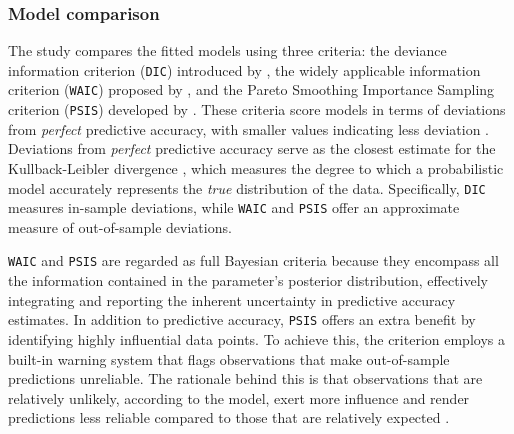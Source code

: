 \documentclass[
  authoryear,
  preprint,
  1p]{elsarticle}
\begin{document}
\subsubsection{Model comparison}\label{sec-M-SM-MC}

{The study compares the fitted models using three criteria: the deviance
information criterion (\texttt{DIC}) introduced by
\citet{Spiegelhalter_et_al_2002}, the widely applicable information
criterion (\texttt{WAIC}) proposed by \citet{Watanabe_2013}, and the
Pareto Smoothing Importance Sampling criterion (\texttt{PSIS}) developed
by \citet{Vehtari_et_al_2017}. These criteria score models in terms of
deviations from \emph{perfect} predictive accuracy, with smaller values
indicating less deviation \citep{McElreath_2020}. Deviations from
\emph{perfect} predictive accuracy serve as the closest estimate for the
Kullback-Leibler divergence \citep{Kullback_et_al_1951}, which measures
the degree to which a probabilistic model accurately represents the
\emph{true} distribution of the data. Specifically, \texttt{DIC}
measures in-sample deviations, while \texttt{WAIC} and \texttt{PSIS}
offer an approximate measure of out-of-sample deviations.}

{\texttt{WAIC} and \texttt{PSIS} are regarded as full Bayesian criteria
because they encompass all the information contained in the parameter's
posterior distribution, effectively integrating and reporting the
inherent uncertainty in predictive accuracy estimates. In addition to
predictive accuracy, \texttt{PSIS} offers an extra benefit by
identifying highly influential data points. To achieve this, the
criterion employs a built-in warning system that flags observations that
make out-of-sample predictions unreliable. The rationale behind this is
that observations that are relatively unlikely, according to the model,
exert more influence and render predictions less reliable compared to
those that are relatively expected \citep{McElreath_2020}.}
\end{document}
